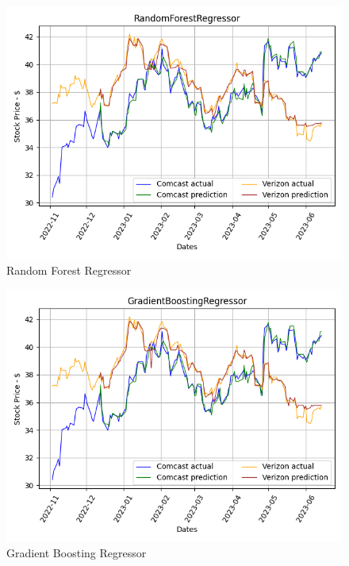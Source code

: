 \documentclass[conference]{IEEEtran}
\begin{document}
\begin{figure}
    \includegraphics[width=\columnwidth]{RandomForestRegressor}
    \caption{Random Forest Regressor}
\end{figure}

\begin{figure}
    \includegraphics[width=\columnwidth]{GradientBoostingRegressor}
    \caption{Gradient Boosting Regressor}
\end{figure}
\end{document}
